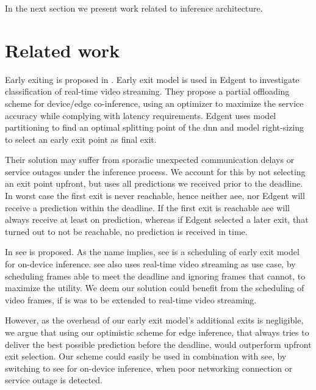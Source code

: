 In the next section we present work related to inference architecture. 

\section{Related work}

Early exiting is proposed in \cite{leroux_resource-constrained_2015, teerapittayanon_branchynet:_2016}. Early exit model is used in Edgent \cite{li_edge_2018} to investigate classification of real-time video streaming. They propose a partial offloading scheme for device/edge co-inference, using an optimizer to maximize the service accuracy while complying with latency requirements. Edgent uses model partitioning to find an optimal splitting point of the \gls{dnn} and model right-sizing to select an early exit point as final exit.

Their solution may suffer from sporadic unexpected communication delays or service outages under the inference process. We account for this by not selecting an exit point upfront, but uses all predictions we received prior to the deadline. In worst case the first exit is never reachable, hence neither \gls{aee}, nor Edgent will receive a prediction within the deadline. If the first exit is reachable \gls{aee} will always receive at least on prediction, whereas if Edgent selected a later exit, that turned out to not be reachable, no prediction is received in time. 

In \cite{wang_see:_2019} \gls{see} is proposed. As the name implies, \gls{see} is a scheduling of early exit model for on-device inference.  \gls{see} also uses real-time video streaming as use case, by scheduling frames able to meet the deadline and  ignoring frames that cannot, to maximize the utility. We deem our solution could benefit from the scheduling of video frames, if is was to be extended to real-time video streaming. 

However, as the overhead of our early exit model's additional exits is negligible, we argue that using our optimistic scheme for edge inference, that always tries to deliver the best possible prediction before the deadline, would outperform upfront exit selection. Our scheme could easily be used in combination with \gls{see}, by switching to \gls{see} for on-device inference, when poor networking connection or service outage is detected. 

